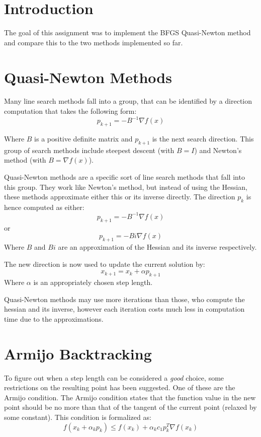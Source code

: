 \documentclass[10pt,oneside,a4paper,final,english]{memoir}
\begin{document}




\maketitle
\newpage

\section{Introduction}
The goal of this assignment was to implement the BFGS Quasi-Newton
method and compare this to the two methods implemented so far.

\section{Quasi-Newton Methods}
Many line search methods fall into a group, that can be identified by
a direction computation that takes the following form:
\[ p_{k+1} = - B^{-1} \nabla f(x) \]

Where $B$ is a positive definite matrix and $p_{k+1}$ is the
next search direction. This group of search methods include steepest
descent (with $B = I$) and Newton's method (with $B = \nabla f(x)$).

Quasi-Newton methods are a specific sort of line search methods that
fall into this group. They work like Newton's method, but instead of
using the Hessian, these methods approximate either this or its
inverse directly. The direction $p_k$ is hence computed as either:
\[ p_{k+1} = - B^{-1} \nabla f(x) \]
or \[ p_{k+1} = - Bi \nabla f(x) \]
Where $B$ and $Bi$ are an approximation of the Hessian and its inverse
respectively.

The new direction is now used to update the current solution by:
\[ x_{k+1} = x_k + \alpha p_{k+1} \]
Where $\alpha$ is an appropriately chosen step length.

Quasi-Newton methods may use more iterations than those, who compute
the hessian and its inverse, however each iteration costs much less in
computation time due to the approximations.

\section{Armijo Backtracking}

To figure out when a step length can be considered a \textit{good}
choice, some restrictions on the resulting point has been
suggested. One of these are the Armijo condition. The Armijo condition
states that the function value in the new point should be no more than
that of the tangent of the current point (relaxed by some
constant). This condition is formalized as:
\[ f(x_k + \alpha_k p_k) \leq f(x_k) +
\alpha_k c_1 p_k^T \nabla f(x_k) \]
\end{document}
